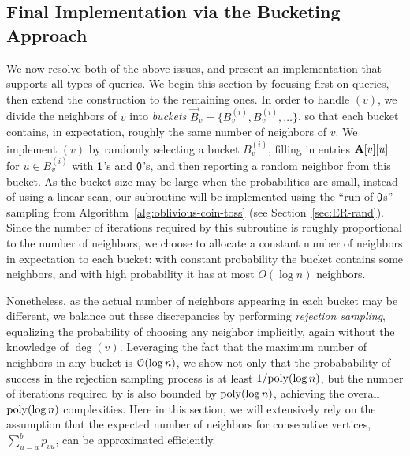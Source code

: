 \subsection{Final Implementation via the Bucketing Approach}
\label{sec:buckets}

We now resolve both of the above issues, and present an implementation that supports all types of queries.
We begin this section by focusing first on  queries, then extend the construction to the remaining ones.
In order to handle $(v)$, we divide the neighbors of $v$ into \emph{buckets} $\vec B_v = \{ B^{(i)}_v, B^{(i)}_v,\ldots\}$,
so that each bucket contains, in expectation, roughly the same number of neighbors of $v$.
We implement $(v)$ by randomly selecting a bucket $B^{(i)}_v$,
filling in entries $\mathbf{A}[v][u]$ for $u \in B^{(i)}_v$ with $\mathsf{1}$'s and $\mathsf{0}$'s, and then reporting a random neighbor from this bucket.
As the bucket size may be large when the probabilities are small, instead of using a linear scan,
our  subroutine will be implemented using the ``run-of-$\mathsf{0}$s'' sampling from  Algorithm~\ref{alg:oblivious-coin-toss}
(see Section~\ref{sec:ER-rand}).
Since the number of iterations required by this subroutine is roughly proportional to the number of neighbors,
we choose to allocate a constant number of neighbors in expectation to each bucket:
with constant probability the bucket contains some neighbors, and with high probability it has at most $O(\log n)$ neighbors.

Nonetheless, as the actual number of neighbors appearing in each bucket may be different,
we balance out these discrepancies by performing \emph{rejection sampling}, equalizing the probability of choosing any neighbor implicitly,
again without the knowledge of $\deg(v)$.
Leveraging the fact that the maximum number of neighbors in any bucket is $\Bo(\log n)$,
we show not only that the probabability of success in the rejection sampling process is at least $1/\mathrm{poly}(\log n)$,
but the number of iterations required by  is also bounded by $\mathrm{poly}(\log n)$, achieving the overall $\mathrm{poly}(\log n)$ complexities.
Here in this section, we will extensively rely on the assumption that the expected number of neighbors for consecutive vertices,
$\sum_{u=a}^b p_{vu}$, can be approximated efficiently.

